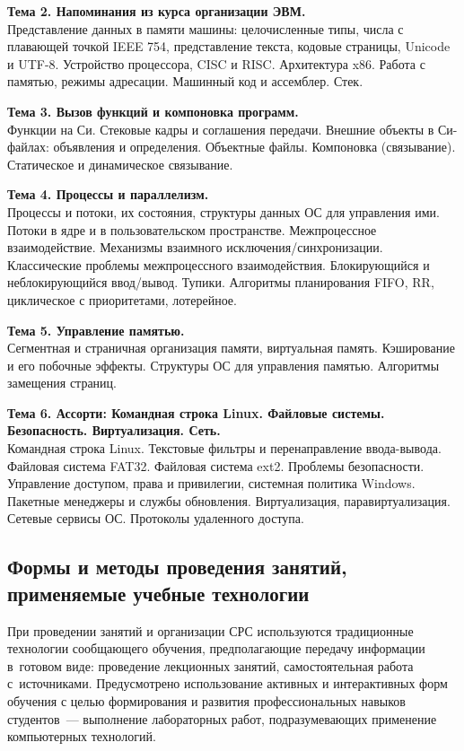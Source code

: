 \documentclass[a4paper,12pt]{article}
\begin{document}
\textbf{Тема 2. Напоминания из курса организации ЭВМ. }\\
Представление данных в памяти машины: целочисленные типы, числа с плавающей
точкой IEEE 754, представление текста, кодовые страницы, Unicode и UTF-8. Устройство
процессора, CISC и RISC. Архитектура x86. Работа с памятью, режимы адресации.
Машинный код и ассемблер. Стек.

\textbf{Тема 3. Вызов функций и компоновка программ.  }\\
Функции на Си. Стековые кадры и соглашения передачи. Внешние объекты в Си-файлах:
объявления и определения. Объектные файлы. Компоновка (связывание). Статическое
и динамическое связывание.

\textbf{Тема 4. Процессы и параллелизм. 			  }\\
Процессы и потоки, их состояния, структуры данных ОС для управления ими. Потоки в ядре
и в пользовательском пространстве. Межпроцессное взаимодействие. Механизмы взаимного
исключения/синхронизации. Классические проблемы межпроцессного взаимодействия.
Блокирующийся и неблокирующийся ввод/вывод. Тупики.
Алгоритмы планирования FIFO, RR, циклическое с приоритетами, лотерейное.

\textbf{Тема 5. Управление памятью.                   }\\
Сегментная и страничная организация памяти, виртуальная память. Кэширование и
его побочные эффекты. Структуры ОС для управления памятью. Алгоритмы замещения страниц.

\textbf{Тема 6. Ассорти: Командная строка Linux. Файловые системы. Безопасность. Виртуализация. Сеть. }\\
Командная строка Linux. Текстовые фильтры и перенаправление ввода-вывода.
Файловая система FAT32. Файловая система ext2. Проблемы безопасности. Управление доступом,
права и привилегии, системная политика Windows. Пакетные менеджеры и службы обновления.
Виртуализация, паравиртуализация. Сетевые сервисы ОС. Протоколы удаленного доступа.
 

\subsection{Формы и методы проведения занятий, применяемые учебные технологии}
При проведении занятий и организации СРС используются традиционные технологии сообщающего обучения, предполагающие передачу информации в~готовом виде: проведение лекционных занятий, самостоятельная работа с~источниками. Предусмотрено использование активных и интерактивных форм обучения с целью формирования и развития профессиональных навыков студентов~--- выполнение лабораторных работ, подразумевающих применение компьютерных технологий. 
\end{document}
